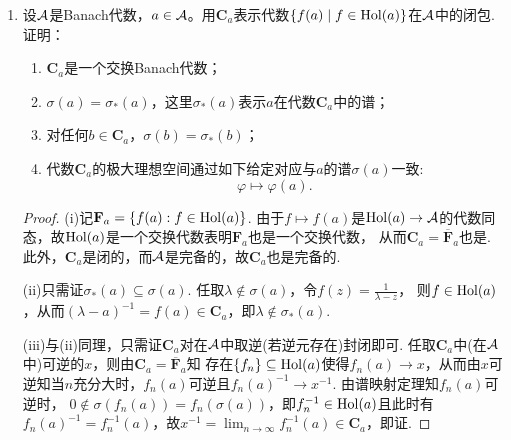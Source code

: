 \begin{enumerate}
\begin{proof}
        任取$f\in\hol(a)$，设$f$在开集$G\supseteq\sigma(a)$上解析，则由Runge定理，存在有理函数列$\{f_n\}\subseteq\hol(a)$在$G$上内闭一致收敛到$f$，
        从而条件(iii)表明$\tau(f)=\displaystyle\lim_{n\to\infty}\tau(f_n)=\lim_{n\to\infty}f_n(a)=f(a)$.
    \end{proof}
    \item 设$\mathcal{A}$是Banach代数，$a\in\mathcal{A}$。用$\mathbf{C}_{a}$表示代数$\{f(a)\mid f\in\mathrm{Hol}(a)\}$在$\mathcal{A}$中的闭包.证明：
        \begin{enumerate}[label=(\roman*)]
            \item $\mathbf{C}_{a}$是一个交换Banach代数；
            \item $\sigma(a)=\sigma_{*}(a)$，这里$\sigma_{*}(a)$表示$a$在代数$\mathbf{C}_{a}$中的谱；
            \item 对任何$b\in\mathbf{C}_{a}$，$\sigma(b)=\sigma_{*}(b)$；
            \item 代数$\mathbf{C}_{a}$的极大理想空间通过如下给定对应与$a$的谱$\sigma(a)$一致:$$\varphi\mapsto\varphi(a).$$
        \end{enumerate}
    \begin{proof}
        (i)记$\mathbf{F}_a=\{f(a):f\in\mathrm{Hol}(a)\}$. 由于$f\mapsto f(a)$是$\mathrm{Hol}(a)\to\mathcal{A}$的代数同态，故$\mathrm{Hol}(a)$是一个交换代数表明$\mathbf{F}_a$也是一个交换代数，
        从而$\mathbf{C}_a=\overline{\mathbf{F}}_a$也是. 此外，$\mathbf{C}_a$是闭的，而$\mathcal{A}$是完备的，故$\mathbf{C}_a$也是完备的.

        (ii)只需证$\sigma_*(a)\subseteq\sigma(a)$. 任取$\lambda\notin\sigma(a)$，令$f(z)=\frac{1}{\lambda-z}$，
        则$f\in\hol(a)$，从而$(\lambda-a)^{-1}=f(a)\in\mathbf{C}_a$，即$\lambda\notin\sigma_*(a)$.

        (iii)与(ii)同理，只需证$\mathbf{C}_a$对在$\mathcal{A}$中取逆(若逆元存在)封闭即可. 任取$\mathbf{C}_a$中(在$\mathcal{A}$中)可逆的$x$，则由$\mathbf{C}_a=\overline{\mathbf{F}}_a$知
        存在$\{f_n\}\subseteq\hol(a)$使得$f_n(a)\to x$，从而由$x$可逆知当$n$充分大时，$f_n(a)$可逆且$f_n(a)^{-1}\to x^{-1}$. 由谱映射定理知$f_n(a)$可逆时，
        $0\notin\sigma(f_n(a))=f_n(\sigma(a))$，即$f_n^{-1}\in\mathrm{Hol}(a)$且此时有$f_n(a)^{-1}=f_n^{-1}(a)$，故$x^{-1}=\displaystyle\lim_{n\to\infty}f_n^{-1}(a)\in\mathbf{C}_a$，即证.


\end{proof}
\end{enumerate}
